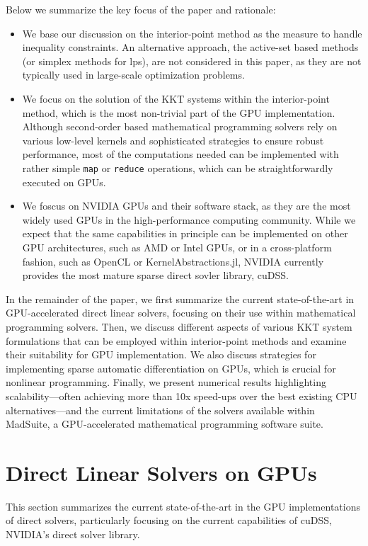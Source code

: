 \documentclass{article}
\begin{document}
Below we summarize the key focus of the paper and rationale:
\begin{itemize}[leftmargin=*,itemsep=0pt,parsep=0pt,partopsep=0pt]
\item We base our discussion on the interior-point method as the measure to handle inequality constraints. An alternative approach, the active-set based methods (or simplex methods for \glspl*{lp}), are not considered in this paper, as they are not typically used in large-scale optimization problems. 
\item We focus on the solution of the KKT systems within the interior-point method, which is the most non-trivial part of the GPU implementation. Although second-order based mathematical programming solvers rely on various low-level kernels and sophisticated strategies to ensure robust performance, most of the computations needed can be implemented with rather simple \texttt{map} or \texttt{reduce} operations, which can be straightforwardly executed on GPUs. 
\item We foscus on NVIDIA GPUs and their software stack, as they are the most widely used GPUs in the high-performance computing community. While we expect that the same capabilities in principle can be implemented on other GPU architectures, such as AMD or Intel GPUs, or in a cross-platform fashion, such as OpenCL or KernelAbstractions.jl, NVIDIA currently provides the most mature sparse direct sovler library, cuDSS.
\end{itemize}
In the remainder of the paper, we first summarize the current state-of-the-art in GPU-accelerated direct linear solvers, focusing on their use within mathematical programming solvers.
Then, we discuss different aspects of various KKT system formulations that can be employed within interior-point methods and examine their suitability for GPU implementation.
We also discuss strategies for implementing sparse automatic differentiation on GPUs, which is crucial for nonlinear programming.
Finally, we present numerical results highlighting scalability---often achieving more than 10x speed-ups over the best existing CPU alternatives---and the current limitations of the solvers available within MadSuite, a GPU-accelerated mathematical programming software suite.

\section{Direct Linear Solvers on GPUs}\label{eqn:linear}
This section summarizes the current state-of-the-art in the GPU implementations of direct solvers, particularly focusing on the current capabilities of cuDSS, NVIDIA's direct solver library.
\end{document}
